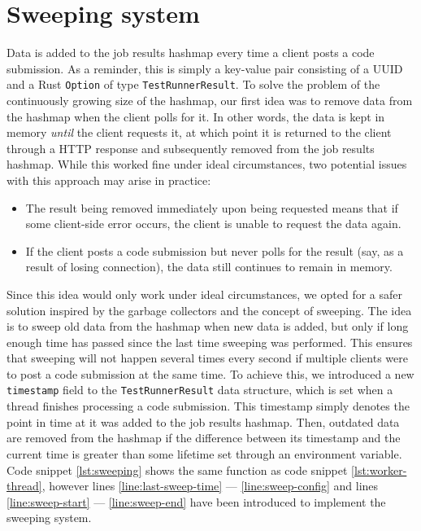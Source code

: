 \section{Sweeping system}
Data is added to the job results hashmap every time a client posts a code submission.
As a reminder, this is simply a key-value pair consisting of a UUID and a Rust \texttt{Option} of type \texttt{TestRunnerResult}.
To solve the problem of the continuously growing size of the hashmap, our first idea was to remove data from the hashmap when the client polls for it.
In other words, the data is kept in memory \textit{until} the client requests it, at which point it is returned to the client through a HTTP response and subsequently removed from the job results hashmap.
While this worked fine under ideal circumstances, two potential issues with this approach may arise in practice:
\begin{itemize}
    \item The result being removed immediately upon being requested means that if some client-side error occurs, the client is unable to request the data again.
    \item If the client posts a code submission but never polls for the result (say, as a result of losing connection), the data still continues to remain in memory.
\end{itemize}

Since this idea would only work under ideal circumstances, we opted for a safer solution inspired by the garbage collectors and the concept of sweeping.
The idea is to sweep old data from the hashmap when new data is added, but only if long enough time has passed since the last time sweeping was performed.
This ensures that sweeping will not happen several times every second if multiple clients were to post a code submission at the same time.
To achieve this, we introduced a new \texttt{timestamp} field to the \texttt{TestRunnerResult} data structure, which is set when a thread finishes processing a code submission.
This timestamp simply denotes the point in time at it was added to the job results hashmap.
Then, outdated data are removed from the hashmap if the difference between its timestamp and the current time is greater than some lifetime set through an environment variable.
Code snippet \ref{lst:sweeping} shows the same function as code snippet \ref{lst:worker-thread}, however lines \ref{line:last-sweep-time} --- \ref{line:sweep-config} and lines \ref{line:sweep-start} --- \ref{line:sweep-end} have been introduced to implement the sweeping system.


